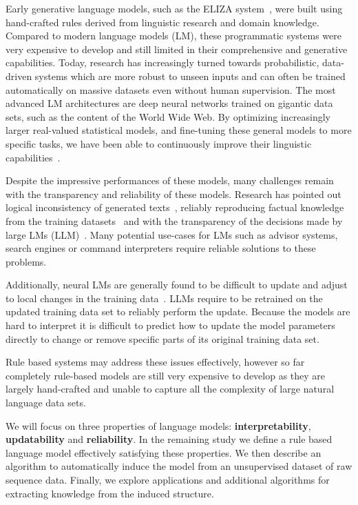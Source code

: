 Early generative language models, such as the ELIZA system~\cite{weizenbaum1966eliza}, were built using hand-crafted rules derived from linguistic research and domain knowledge.
Compared to modern language models (LM), these programmatic systems were very expensive to develop and still limited in their comprehensive and generative capabilities. Today, research has increasingly turned towards probabilistic, data-driven systems which are more robust to unseen inputs and can often be trained automatically on massive datasets even without human supervision.
The most advanced LM architectures are deep neural networks trained on gigantic data sets, such as the content of the World Wide Web. By optimizing increasingly larger real-valued statistical models, and fine-tuning these general models to more specific tasks, we have been able to continuously improve their linguistic capabilities~\cite{brown2020language}.
\par
\noindent
Despite the impressive performances of these models, many challenges remain with the transparency and reliability of these models. Research has pointed out logical inconsistency of generated texts~\cite{ji2023survey}, reliably reproducing factual knowledge from the training datasets~\cite{filippova2020controlled} and with the transparency of the decisions made by large LMs (LLM)~\cite{camburu2019make}.
Many potential use-cases for LMs such as advisor systems, search engines or command interpreters require reliable solutions to these problems.
\par
\noindent
Additionally, neural LMs are generally found to be difficult to update and adjust to local changes in the training data~\cite{south2023transparency}. LLMs require to be retrained on the updated training data set to reliably perform the update. Because the models are hard to interpret it is difficult to predict how to update the model parameters directly to change or remove specific parts of its original training data set.
\par
\noindent
Rule based systems may address these issues effectively, however so far completely rule-based models are still very expensive to develop as they are largely hand-crafted and unable to capture all the complexity of large natural language data sets.
\par
\noindent
We will focus on three properties of language models: \textbf{interpretability}, \textbf{updatability} and \textbf{reliability}. In the remaining study we define a rule based language model effectively satisfying these properties. We then describe an algorithm to automatically induce the model from an unsupervised dataset of raw sequence data. Finally, we explore applications and additional algorithms for extracting knowledge from the induced structure.
\par


